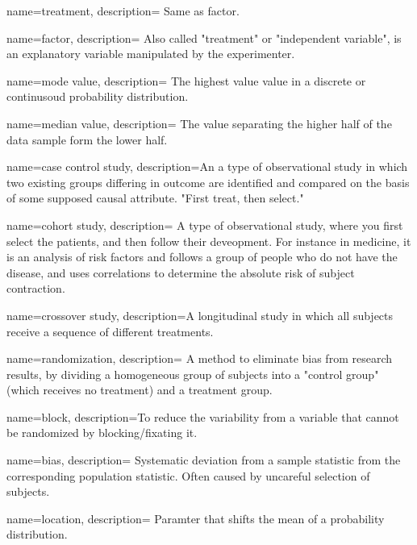 {
    name=treatment,
    description={ Same as factor.}
}

{
    name=factor,
    description={ Also called "treatment" or "independent variable", is an explanatory
    variable manipulated by the experimenter.}
}

{
    name=mode value,
    description={ The highest value value in a discrete or continusoud
    probability distribution.}
}

{
    name=median value,
    description={ The value separating the higher half of the data sample form the lower
    half.}
}

{
    name=case control study,
    description={An a type of observational study in which two existing groups differing in
    outcome are identified and compared on the basis of some supposed causal
    attribute. "First treat, then select."}
}

{
    name=cohort study,
    description={ A type of observational study, where you first select the patients, and
    then follow their deveopment. For instance in medicine, it is an analysis
    of risk factors and follows a group of people who do not have the disease,
    and uses correlations to determine the absolute risk of subject
    contraction.}
}

{
    name=crossover study,
    description={A longitudinal study in which all subjects receive a sequence of different
    treatments.}
}

{
    name=randomization,
    description={ A method to eliminate bias from research results, by dividing a
    homogeneous group of subjects into a "control group" (which receives no
    treatment) and a treatment group.}
}

{
    name=block,
    description={To reduce the variability from a variable that cannot be randomized by
    blocking/fixating it.}
}

{
    name=bias,
    description={ Systematic deviation from a sample statistic from the corresponding
    population statistic. Often caused by uncareful selection of subjects.}
}

{
    name=location,
    description={ Paramter that shifts the mean of a probability
    distribution.}
}

